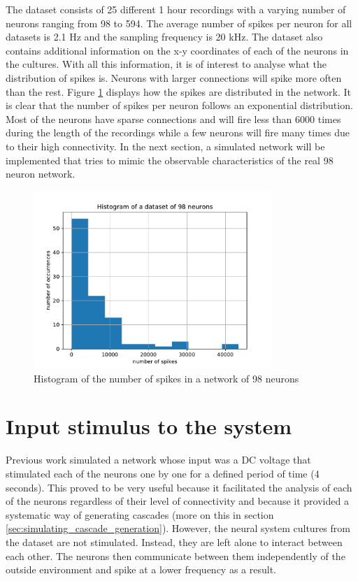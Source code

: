 The dataset consists of 25 different 1 hour recordings with a varying number of neurons ranging from 98 to 594. The average number of spikes per neuron for all datasets is 2.1 Hz and the sampling frequency is 20 kHz. The dataset also contains additional information on the x-y coordinates of each of the neurons in the cultures. With all this information, it is of interest to analyse what the distribution of spikes is. Neurons with larger connections will spike more often than the rest. Figure \ref{fig:histogram_spikes} displays how the spikes are distributed in the network. It is clear that the number of spikes per neuron follows an exponential distribution. Most of the neurons have sparse connections and will fire less than 6000 times during the length of the recordings while a few neurons will fire many times due to their high connectivity. In the next section, a simulated network will be implemented that tries to mimic the observable characteristics of the real 98 neuron network.\\

\begin{figure}
	\centering
	\includegraphics[width=0.8\textwidth]{histogram_number_spikes_dataset.pdf}
	\caption{Histogram of the number of spikes in a network of 98 neurons}
	\label{fig:histogram_spikes}
\end{figure}

\section{Input stimulus to the system}

Previous work \cite{alexandru2018estimating} simulated a network whose input was a DC voltage that stimulated each of the neurons one by one for a defined period of time (4 seconds). This proved to be very useful because it facilitated the analysis of each of the neurons regardless of their level of connectivity and because it provided a systematic way of generating cascades (more on this in section \ref{sec:simulating_cascade_generation}).
However, the neural system cultures from the dataset are not stimulated. Instead, they are left alone to interact between each other. The neurons then communicate between them independently of the outside environment and spike at a lower frequency as a result. \\

